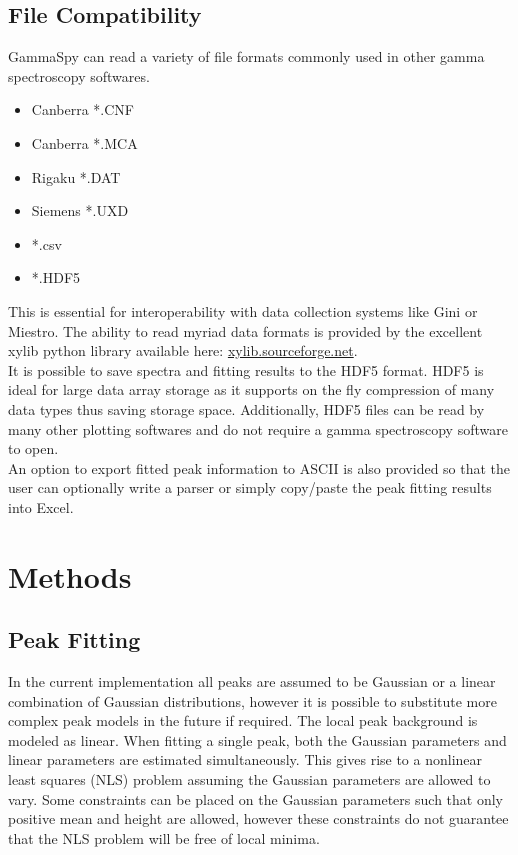 \documentclass[10pt]{article}
\begin{document}
\subsection{File Compatibility}
GammaSpy can read a variety of file formats commonly used in other gamma spectroscopy softwares.
\begin{itemize}
    \item Canberra *.CNF
    \item Canberra *.MCA
    \item Rigaku *.DAT
    \item Siemens *.UXD
    \item *.csv
    \item *.HDF5
\end{itemize}
This is essential for interoperability with data collection systems like Gini
or Miestro.  The ability to read myriad data formats is provided by the
excellent xylib python library available here: \url{xylib.sourceforge.net}. \\

It is possible to save spectra and fitting results to the HDF5 format.  HDF5 is
ideal for large data array storage as it supports on the fly compression of
many data types thus saving storage space.  Additionally, HDF5 files can be
read by many other plotting softwares and do not require a gamma spectroscopy
software to open. \\

An option to export fitted peak information to ASCII is also provided so that
the user can optionally write a parser or simply copy/paste the peak fitting
results into Excel. \\

\section{Methods}

\subsection{Peak Fitting}

In the current implementation all peaks are assumed to be Gaussian or a linear
combination of Gaussian distributions, however it is possible to substitute
more complex peak models in the future if required.  The local peak background
is modeled as linear.  When fitting a single peak, both the Gaussian parameters
and linear parameters are estimated simultaneously.  This gives rise to a
nonlinear least squares (NLS) problem assuming the Gaussian parameters are
allowed to vary.  Some constraints can be placed on the Gaussian parameters
such that only positive mean and height are allowed, however these constraints
do not guarantee that the NLS problem will be free of local minima.
\end{document}

